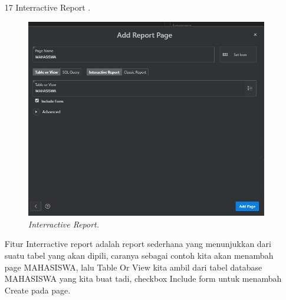 \begin{enumerate}
\item[17]Interractive Report .
\begin{figure}[!htbp]
    \begin{center}
    \includegraphics[scale=0.5]{figures/interractive_rprt.jpg}
    \caption{\textit{Interractive Report.}}
    \end{center}
\end{figure}
\par Fitur Interractive report adalah report sederhana yang menunjukkan dari suatu tabel yang akan dipili, caranya sebagai contoh kita akan menambah page MAHASISWA, lalu Table Or View kita ambil dari tabel database MAHASISWA yang kita buat tadi, checkbox Include form untuk menambah Create pada page.


\end{enumerate}
